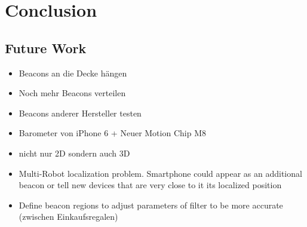 \chapter{Conclusion} \label{chap:conclusion}

\section{Future Work} \label{sec:future}

\begin{itemize}
	\item Beacons an die Decke hängen
	\item Noch mehr Beacons verteilen
	\item Beacons anderer Hersteller testen
	\item Barometer von iPhone 6 + Neuer Motion Chip M8
	\item nicht nur 2D sondern auch 3D
	\item Multi-Robot localization problem. Smartphone could appear as an additional beacon or tell new devices that are very close to it its localized position
	\item Define beacon regions to adjust parameters of filter to be more accurate (zwischen Einkaufsregalen)
\end{itemize}
